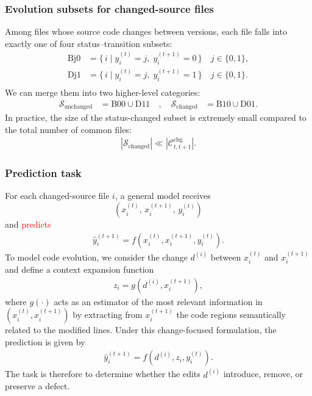 \documentclass[authoryear,final,5p,times,twocolumn]{elsarticle}
\theoremstyle{plain}
\begin{document}
\subsubsection{Evolution subsets for changed-source files}
Among files whose source code changes between versions, each file falls
into exactly one of four status–transition subsets:
\[
\begin{aligned}
\mathrm{Bj0} &= \{\, i \mid y^{(t)}_i=j,\; y^{(t+1)}_i=0 \,\}\quad j \in \{0,1\},\\
\mathrm{Dj1} &= \{\, i \mid y^{(t)}_i=j,\; y^{(t+1)}_i=1 \,\}\quad j \in \{0,1\}.\\
\end{aligned}
\]
We can merge them into two higher-level categories:
\[
\begin{aligned}
\mathcal{S}_{\text{unchanged}} &= \mathrm{B00} \cup \mathrm{D11} \quad ,\quad\mathcal{S}_{\text{changed}}   &= \mathrm{B10} \cup \mathrm{D01}.
\end{aligned}
\]
In practice, the size of the status-changed subset is extremely small compared to the total number of common files:
\begin{align}
|\mathcal{S}_{\text{changed}}| \ll |\mathcal{C}^{\text{chg}}_{t,t+1}|.
\end{align}

\subsubsection{Prediction task}
For each changed-source file \(i\), a general model receives 
\[
(x^{(t)}_i,\, x^{(t+1)}_i,\, y^{(t)}_i)
\]
and \textcolor{red}{predicts}
\begin{align}
\hat{y}^{(t+1)}_i = f(x^{(t)}_i, x^{(t+1)}_i, y^{(t)}_i).
\end{align}
To model code evolution, we consider the change \(d^{(i)}\) between \(x^{(t)}_i\) and \(x^{(t+1)}_i\) and define a context expansion function 
\begin{align}
    z_i = g(d^{(i)}, x^{(t+1)}_i),
\end{align}
where \(g(\cdot)\) acts as an estimator of the most relevant information in \((x^{(t)}_i, x^{(t+1)}_i)\) by extracting from \(x^{(t+1)}_i\) the code regions semantically related to the modified lines. Under this change-focused formulation, the prediction is given by
\begin{align}
\hat{y}^{(t+1)}_i = f(d^{(i)}, z_i, y^{(t)}_i).
\end{align}
The task is therefore to determine whether the edits \(d^{(i)}\) introduce, remove, or preserve a defect.
\end{document}
